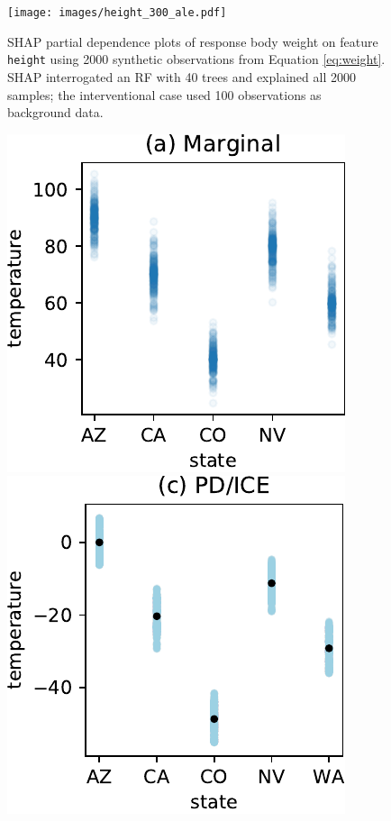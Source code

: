 \documentclass{article}
\begin{document}
\begin{figure}[htbp]
\begin{center}
\texttt{[image: images/height\_300\_ale.pdf]}~~
\caption{\small SHAP partial dependence plots of response body weight on feature {\tt height} using 2000 synthetic observations from Equation \eqref{eq:weight}. SHAP interrogated an RF with 40 trees and explained all 2000 samples; the interventional case used 100 observations as background data.}
\label{fig:shap-weight}
\end{center}
\end{figure}

\begin{figure}[htbp]
\begin{center}
\includegraphics[scale=0.4]{images/state_vs_temp.pdf}~~
\includegraphics[scale=0.4]{images/state_vs_temp_pdp.pdf}~~

\end{center}
\end{figure}
\end{document}
